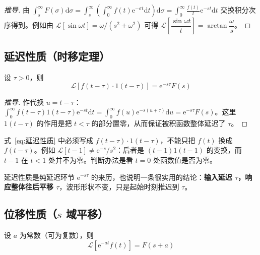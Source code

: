 \begin{proof}[推导]
由 $\int_{s}^{\infty}F(\sigma)\mathrm{d}\sigma=\int_{s}^{\infty}\!\left(\int_{0}^{\infty}f(t)\mathrm{e}^{-\sigma t}\mathrm{d}t\right)\mathrm{d}\sigma=\int_{0}^{\infty}\frac{f(t)}{t}\mathrm{e}^{-st}\mathrm{d}t$ 交换积分次序得到。例如由 $\mathcal{L}[\sin\omega t]=\omega/(s^{2}+\omega^{2})$ 可得 $\mathcal{L}\left[\dfrac{\sin\omega t}{t}\right]=\arctan\dfrac{\omega}{s}$。
\end{proof}

\subsection{延迟性质（时移定理）}

\begin{property}[延迟性质]
设 $\tau>0$，则
\begin{equation}
\mathcal{L}\left[f(t-\tau)\cdot 1(t-\tau)\right]=\mathrm{e}^{-s\tau}F(s)
\label{eq:延迟性质}
\end{equation}
\end{property}

\begin{proof}[推导]
作代换 $u=t-\tau$：$\int_{0}^{\infty}f(t-\tau)1(t-\tau)\mathrm{e}^{-st}\mathrm{d}t=\int_{0}^{\infty}f(u)\mathrm{e}^{-s(u+\tau)}\mathrm{d}u=\mathrm{e}^{-s\tau}F(s)$。这里 $1(t-\tau)$ 的作用是把 $t<\tau$ 的部分置零，从而保证被积函数整体延迟了 $\tau$。
\end{proof}

\begin{warnbox}[最容易写错的一条]
式~\eqref{eq:延迟性质} 中必须写成 $f(t-\tau)\cdot 1(t-\tau)$，不能只把 $f(t)$ 换成 $f(t-\tau)$。例如 $\mathcal{L}\left[t-1\right]\neq \mathrm{e}^{-s}/s^{2}$：后者是 $(t-1)1(t-1)$ 的变换，而 $t-1$ 在 $t<1$ 处并不为零。判断办法是看 $t=0$ 处函数值是否为零。
\end{warnbox}

\begin{note}
延迟性质是纯延迟环节 $\mathrm{e}^{-s\tau}$ 的来历，也说明一条很实用的结论：\textbf{输入延迟 $\tau$，响应整体往后平移 $\tau$}，波形形状不变，只是起始时刻推迟到 $\tau$。
\end{note}

\subsection{位移性质（$s$ 域平移）}

\begin{property}[位移性质]
设 $a$ 为常数（可为复数），则
\begin{equation}
\mathcal{L}\left[\mathrm{e}^{-at}f(t)\right]=F(s+a)
\label{eq:位移性质}
\end{equation}
\end{property}

